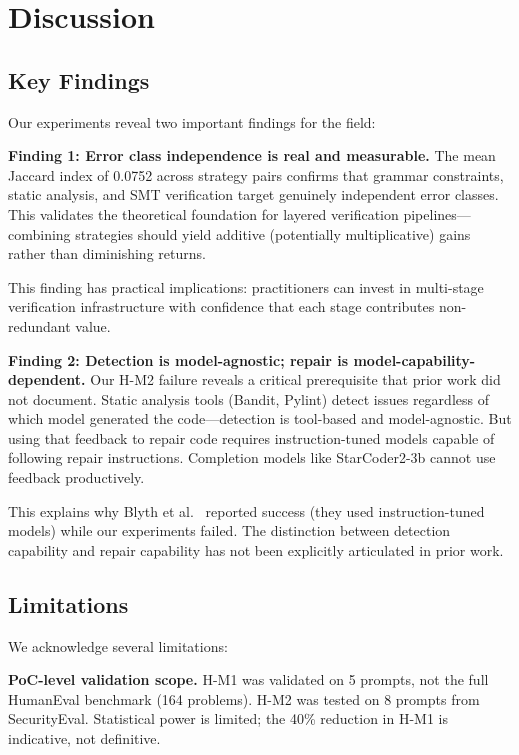 \section{Discussion}
\label{sec:discussion}

\subsection{Key Findings}

Our experiments reveal two important findings for the field:

\textbf{Finding 1: Error class independence is real and measurable.} The mean Jaccard index of 0.0752 across strategy pairs confirms that grammar constraints, static analysis, and SMT verification target genuinely independent error classes. This validates the theoretical foundation for layered verification pipelines---combining strategies should yield additive (potentially multiplicative) gains rather than diminishing returns.

This finding has practical implications: practitioners can invest in multi-stage verification infrastructure with confidence that each stage contributes non-redundant value.

\textbf{Finding 2: Detection is model-agnostic; repair is model-capability-dependent.} Our H-M2 failure reveals a critical prerequisite that prior work did not document. Static analysis tools (Bandit, Pylint) detect issues regardless of which model generated the code---detection is tool-based and model-agnostic. But using that feedback to repair code requires instruction-tuned models capable of following repair instructions. Completion models like StarCoder2-3b cannot use feedback productively.

This explains why Blyth et al.~\cite{blyth2025static} reported success (they used instruction-tuned models) while our experiments failed. The distinction between detection capability and repair capability has not been explicitly articulated in prior work.

\subsection{Limitations}

We acknowledge several limitations:

\textbf{PoC-level validation scope.} H-M1 was validated on 5 prompts, not the full HumanEval benchmark (164 problems). H-M2 was tested on 8 prompts from SecurityEval. Statistical power is limited; the 40\% reduction in H-M1 is indicative, not definitive.

